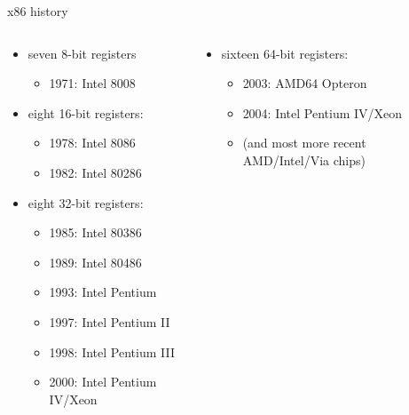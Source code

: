 \begin{frame}[fragile,label=x86Hist]{x86 history}
\begin{columns}
\begin{column}{0.5\textwidth}
\begin{itemize}
\item seven 8-bit registers
\begin{itemize}
    \item 1971: Intel 8008
\end{itemize}
\item eight 16-bit registers:
\begin{itemize}
    \item 1978: Intel 8086
    \item 1982: Intel 80286
\end{itemize}
\item eight 32-bit registers:
\begin{itemize}
    \item 1985: Intel 80386
    \item 1989: Intel 80486
    \item 1993: Intel Pentium
    \item 1997: Intel Pentium II
    \item 1998: Intel Pentium III
    \item 2000: Intel Pentium IV/Xeon
\end{itemize}
\end{itemize}
\end{column}
\begin{column}{0.5\textwidth}
\begin{itemize}
\item sixteen 64-bit registers:
\begin{itemize}
\item 2003: AMD64 Opteron
\item 2004: Intel Pentium IV/Xeon
\item (and most more recent AMD/Intel/Via chips)
\end{itemize}
\end{itemize}
\end{column}
\end{columns}
\end{frame}
